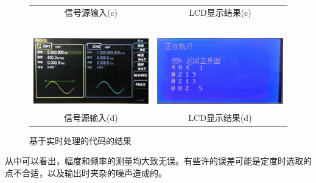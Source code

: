 \documentclass[12pt]{article}
\begin{document}
\begin{figure}[htbp]
\begin{tabular}{cc}
  信号源输入(c)&LCD显示结果(c)\\
   \ &\ \\
        \includegraphics[height=3cm]{15}&\includegraphics[height=3cm]{16}\\
  信号源输入(d)&LCD显示结果(d)\\
  \end{tabular}
  \caption{基于实时处理的代码的结果}\label{sscljg}
\end{figure}\par
从中可以看出，幅度和频率的测量均大致无误。有些许的误差可能是定度时选取的点不合适，以及输出时夹杂的噪声造成的。
\end{document}
